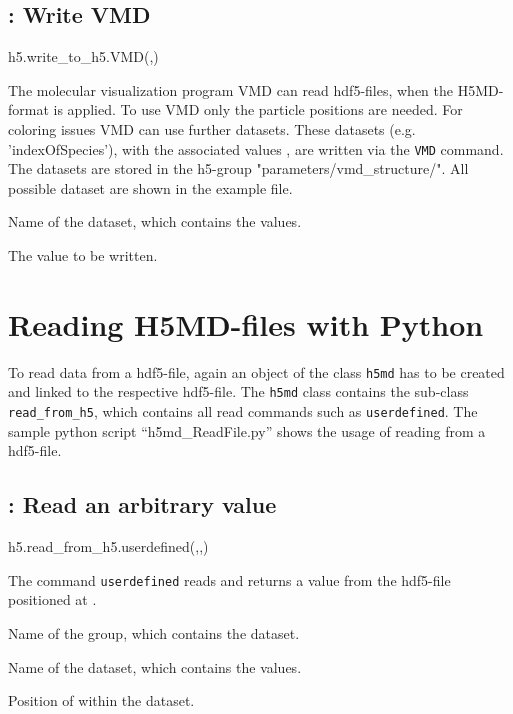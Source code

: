 \subsection{: Write VMD}
\begin{pyessyntax}
h5.write_to_h5.VMD(,)
\end{pyessyntax}
The molecular visualization program VMD can read hdf5-files, when the H5MD-format is applied. To use VMD only the particle positions are needed. For coloring issues VMD can use further datasets. These datasets  (e.g. 'indexOfSpecies'), with the associated values , are written via the \texttt{VMD} command. The datasets are stored in the h5-group "parameters/vmd_structure/". All possible dataset are shown in the example file. 
\begin{arguments}
\item[\var{datasetname}] Name of the dataset, which contains the values.
\item[\var{value}] The value to be written.
\end{arguments}


\section{Reading H5MD-files with Python}
To read data from a hdf5-file, again an object of the class \texttt{h5md} has to be created and linked to the respective hdf5-file. The \texttt{h5md} class contains the sub-class \texttt{read_from_h5}, which contains all read commands such as \texttt{userdefined}. The sample python script ``h5md_ReadFile.py'' shows the usage of reading from a hdf5-file.
\subsection{: Read an arbitrary value}
\begin{pyessyntax}
h5.read_from_h5.userdefined(,,)
\end{pyessyntax}
The command \texttt{userdefined} reads and returns a value from the hdf5-file positioned at .
\begin{arguments}
\item[\var{groupname}] Name of the group, which contains the dataset.
\item[\var{datasetname}] Name of the dataset, which contains the values.
\item[\var{datasetindex}] Position of  within the dataset.
\end{arguments}

